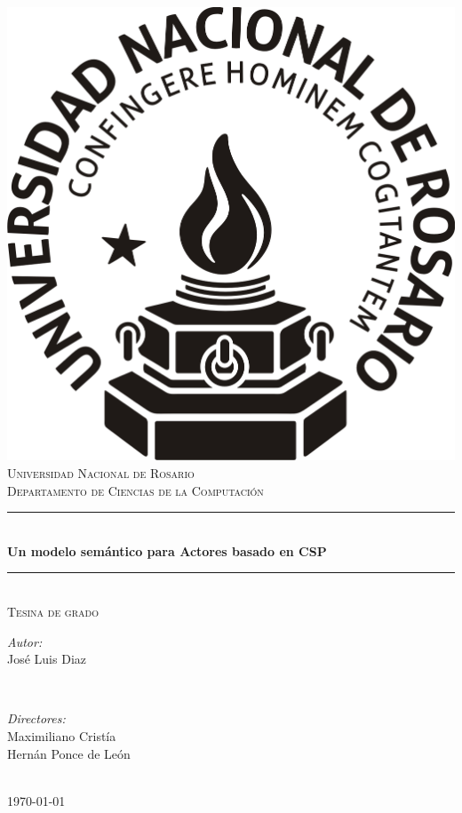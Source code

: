 \begin{titlepage}
\centering
\vspace*{0.5 cm}
        \includegraphics[width=3.0 cm]{img/logo.png}\\[1.0 cm]
        \textsc{\LARGE Universidad Nacional de Rosario}\\[0.5 cm]
	\textsc{\large Departamento de Ciencias de la Computaci\'{o}n}\\[2.5 cm]

	\rule{\linewidth}{0.3 mm} \\[0.4 cm]
	{ \huge \bfseries Un modelo semántico para Actores basado en CSP }\\
	\rule{\linewidth}{0.3 mm} \\[0.5 cm]
	\textsc{\Large Tesina de grado}\\[2.5 cm]
	
	\begin{minipage}{0.4\textwidth}
	\begin{flushleft} \large
	  \emph{Autor:}\\
	  José Luis Diaz  \\
	\end{flushleft}
	\end{minipage}~
	\begin{minipage}{0.4\textwidth}
        \begin{flushright} \large
	  \emph{Directores:} \\
	  Maximiliano Cristía \\
	  Hernán Ponce de León \\
	\end{flushright}        
	\end{minipage}\\[1.5 cm]
        \today

\end{titlepage}
